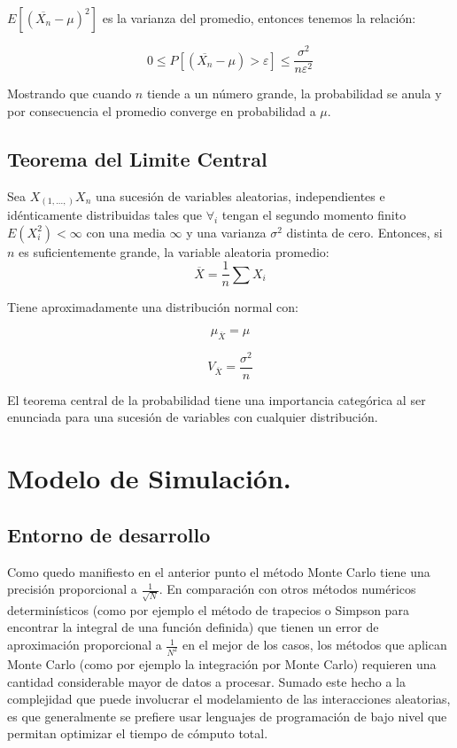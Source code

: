 \documentclass{rbf}
\begin{document}
$E[(\overline{X_n}-\mu)^2]$ es la varianza del promedio, entonces tenemos la relación:

\begin{equation}
  \displaystyle   0\leq P[(\overline{X_n}-\mu)>\varepsilon] \leq \frac{\sigma^2}{n\varepsilon^2}
\end{equation}

Mostrando que cuando $n$ tiende a un número grande, la probabilidad se anula y por consecuencia el promedio converge en probabilidad a $\mu$.

\subsection{Teorema del Limite Central}
Sea $X_(1,...,) X_n$ una sucesión de variables aleatorias, independientes e idénticamente distribuidas tales que $\forall_i$  tengan el segundo momento finito  $E(X_i^2)<\infty$ con una media $\infty$ y una varianza $\sigma^2$ distinta de cero. Entonces, si $n$ es suficientemente grande, la variable aleatoria promedio:
\begin{equation}
  \displaystyle   \overline{X}=\frac{1}{n}\sum X_i
\end{equation}

Tiene aproximadamente una distribución normal con:

\begin{equation}
 \displaystyle    \mu_{\overline{X}} =\mu
\end{equation}

\begin{equation}
  \displaystyle   V_{\overline{X}} =\frac{\sigma^2}{n}
\end{equation}

El teorema central de la probabilidad tiene una importancia categórica al ser enunciada para una sucesión de variables con cualquier distribución. 

\section{Modelo de Simulación.}
\subsection{Entorno de desarrollo}

Como quedo manifiesto en el anterior punto el método Monte Carlo tiene una precisión proporcional a $\frac{1}{\sqrt{N}}$. En comparación con otros métodos numéricos determinísticos (como por ejemplo el método de trapecios o Simpson para encontrar la integral de una función definida) que tienen un error de aproximación proporcional a $\frac{1}{N^2}$ en el mejor de los casos, los métodos que aplican Monte Carlo (como por ejemplo la integración por Monte Carlo) requieren una cantidad considerable mayor de datos a procesar. Sumado este hecho a la complejidad que puede involucrar el modelamiento de las interacciones aleatorias, es que generalmente se prefiere usar lenguajes de programación de bajo nivel que permitan optimizar el tiempo de cómputo total.
\end{document}
